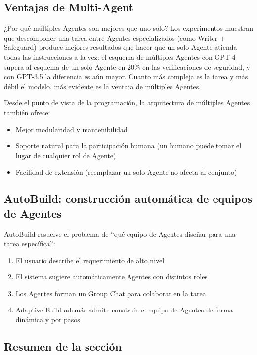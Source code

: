 \documentclass[a4paper]{article}
\begin{document}
\subsection{Ventajas de Multi-Agent}

\begin{importantbox}{¿Por qué múltiples Agentes son mejores que uno solo?}
Los experimentos muestran que descomponer una tarea entre Agentes especializados (como Writer + Safeguard) produce mejores resultados que hacer que un solo Agente atienda todas las instrucciones a la vez: el esquema de múltiples Agentes con GPT-4 supera al esquema de un solo Agente en 20\% en las verificaciones de seguridad, y con GPT-3.5 la diferencia es aún mayor. Cuanto más compleja es la tarea y más débil el modelo, más evidente es la ventaja de múltiples Agentes.
\end{importantbox}

Desde el punto de vista de la programación, la arquitectura de múltiples Agentes también ofrece:
\begin{itemize}
    \item Mejor modularidad y mantenibilidad
    \item Soporte natural para la participación humana (un humano puede tomar el lugar de cualquier rol de Agente)
    \item Facilidad de extensión (reemplazar un solo Agente no afecta al conjunto)
\end{itemize}

\subsection{AutoBuild: construcción automática de equipos de Agentes}

AutoBuild resuelve el problema de ``qué equipo de Agentes diseñar para una tarea específica'':
\begin{enumerate}
    \item El usuario describe el requerimiento de alto nivel
    \item El sistema sugiere automáticamente Agentes con distintos roles
    \item Los Agentes forman un Group Chat para colaborar en la tarea
    \item Adaptive Build además admite construir el equipo de Agentes de forma dinámica y por pasos
\end{enumerate}

\subsection{Resumen de la sección}
\end{document}
